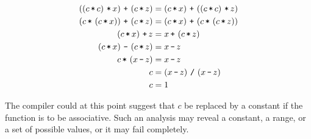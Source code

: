 \begin{align*}
\p{\p{c \lt c} \lt x} \lp \p{c \lt z} &= \p{c \lt x} \lp \p{\p{c \lt c} \lt z} \\
\p{c \lt \p{c \lt x}} \lp \p{c \lt z} &= \p{c \lt x} \lp \p{c \lt \p{c \lt z}} \\
\p{c \lt x} \lp z &= x \lp \p{c \lt z} \\
\p{c \lt x} \lm \p{c \lt z} &= x \lm z \\
c \lt \p{x \lm z} &= x \lm z \\
c &= \p{x \lm z} \ld  \p{x \lm z} \\
c &= 1
\end{align*}

The compiler could at this point suggest that $c$ be replaced by a constant if
the function is to be associative. Such an analysis may reveal a constant, a
range, or a set of possible values, or it may fail completely.

